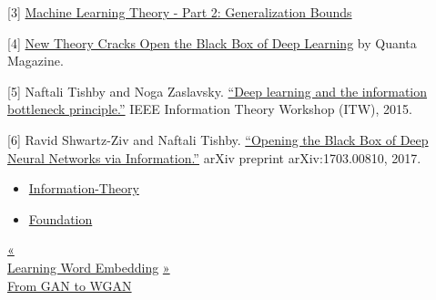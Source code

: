 {[}3{]} \href{https://mostafa-samir.github.io/ml-theory-pt2/}{Machine Learning Theory - Part 2: Generalization Bounds}

{[}4{]} \href{https://www.quantamagazine.org/new-theory-cracks-open-the-black-box-of-deep-learning-20170921/}{New Theory Cracks Open the Black Box of Deep Learning} by Quanta Magazine.

{[}5{]} Naftali Tishby and Noga Zaslavsky. \href{https://arxiv.org/pdf/1503.02406.pdf}{``Deep learning and the information bottleneck principle.''} IEEE Information Theory Workshop (ITW), 2015.

{[}6{]} Ravid Shwartz-Ziv and Naftali Tishby. \href{https://arxiv.org/pdf/1703.00810.pdf}{``Opening the Black Box of Deep Neural Networks via Information.''} arXiv preprint arXiv:1703.00810, 2017.

\begin{itemize}
\tightlist
\item
  \href{https://lilianweng.github.io/tags/information-theory/}{Information-Theory}
\item
  \href{https://lilianweng.github.io/tags/foundation/}{Foundation}
\end{itemize}

\href{https://lilianweng.github.io/posts/2017-10-15-word-embedding/}{{« }\\
{Learning Word Embedding}} \href{https://lilianweng.github.io/posts/2017-08-20-gan/}{{ »}\\
{From GAN to WGAN}}

